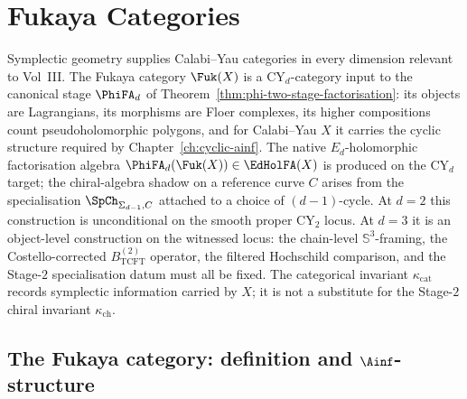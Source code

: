 \chapter{Fukaya Categories}
\label{ch:fukaya}

Symplectic geometry supplies Calabi--Yau categories in every dimension
relevant to Vol~III. The Fukaya category $\Fuk(X)$ is a CY$_d$-category
input to the canonical stage $\PhiFA_d$ of
Theorem~\ref{thm:phi-two-stage-factorisation}: its objects are
Lagrangians, its morphisms are Floer complexes, its higher compositions
count pseudoholomorphic polygons, and for Calabi--Yau $X$ it carries
the cyclic structure required by Chapter~\ref{ch:cyclic-ainf}. The
native $E_d$-holomorphic factorisation algebra
$\PhiFA_d(\Fuk(X)) \in \EdHolFA(X)$ is produced on the CY$_d$ target;
the chiral-algebra shadow on a reference curve $C$ arises from the
specialisation $\SpCh_{\Sigma_{d-1}, C}$ attached to a choice of
$(d-1)$-cycle. At $d = 2$ this construction is unconditional on the
smooth proper CY$_2$ locus. At $d = 3$ it is an object-level
construction on the witnessed locus: the chain-level
$\mathbb{S}^3$-framing, the Costello-corrected
$B^{(2)}_{\mathrm{TCFT}}$ operator, the filtered Hochschild
comparison, and the Stage-$2$ specialisation datum must all be fixed.
The categorical invariant $\kappa_{\mathrm{cat}}$ records
symplectic information carried by $X$; it is not a substitute for the
Stage-$2$ chiral invariant $\kappa_{\mathrm{ch}}$.


\section{The Fukaya category: definition and \texorpdfstring{$\Ainf$}{A-inf}-structure}
\label{sec:fukaya-def}


